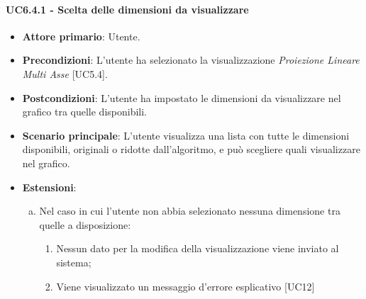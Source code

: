 \paragraph{UC6.4.1 - Scelta delle dimensioni da visualizzare}
\begin{itemize}
	\item \textbf{Attore primario}: Utente.
	\item \textbf{Precondizioni}: L'utente ha selezionato la visualizzazione \textit{Proiezione Lineare Multi Asse} [UC5.4].
	\item \textbf{Postcondizioni}: L'utente ha impostato le dimensioni da visualizzare nel grafico tra quelle disponibili.
	
	\item \textbf{Scenario principale}: L'utente visualizza una lista con tutte le dimensioni disponibili, originali o ridotte dall'algoritmo, e può scegliere quali visualizzare nel grafico.
	
	\item \textbf{Estensioni}:
	\begin{enumerate}[(a)]
		\item Nel caso in cui l'utente non abbia selezionato nessuna dimensione tra quelle a disposizione:
		\begin{enumerate}[1.]
			\item Nessun dato per la modifica della visualizzazione viene inviato al sistema;
			\item Viene visualizzato un messaggio d'errore esplicativo [UC12]
		\end{enumerate}
	\end{enumerate}
\end{itemize}